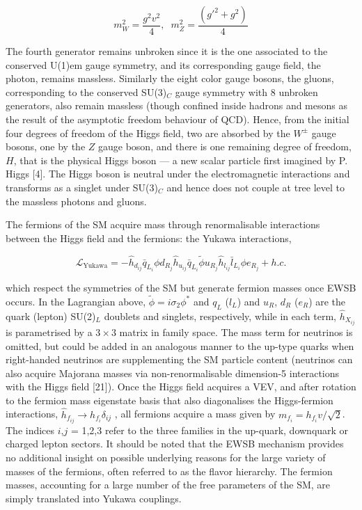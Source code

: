 \documentclass[12pt]{article}
\begin{document}
\begin{equation}
    m_W^2 = \frac{g^2v^2}{4}, \hspace{7pt} m_Z^2 = \frac{(g'^2+g^2)}{4}
\end{equation}

The fourth generator remains unbroken since it is the one associated to the conserved U(1)$\text{em}$ gauge symmetry, and its corresponding gauge field, the photon, remains massless. Similarly the eight color gauge bosons, the gluons, corresponding to the conserved SU(3)$_C$ gauge symmetry with 8 unbroken generators, also remain massless (though confined inside hadrons and mesons as the result of the asymptotic freedom behaviour of QCD). Hence, from the initial four degrees of freedom of the Higgs field, two are absorbed by the $W^\pm$ gauge bosons, one by the $Z$ gauge boson, and there is one remaining degree of freedom, $H$, that is the physical Higgs boson — a new scalar particle first imagined by P. Higgs [4]. The Higgs boson is neutral under the electromagnetic interactions and transforms as a singlet under SU(3)$_C$ and hence does not couple at tree level to the massless photons and gluons.

The fermions of the SM acquire mass through renormalisable interactions between the Higgs field and the fermions: the Yukawa interactions,

\begin{equation}
    \mathcal{L}_\text{Yukawa} = -\hat{h}_{d_{ij}} \bar{q}_{L_i}\phi d_{R_j} \hat{h}_{u_{ij}} \bar{q}_{L_i}\tilde{\phi} u_{R_j} \hat{h}_{l_{ij}} \bar{l}_{L_i}\phi e_{R_j} + h.c.
\end{equation}

which respect the symmetries of the SM but generate fermion
masses once EWSB occurs. In the Lagrangian above, $\tilde{\phi} = i\sigma_2\phi^*$ and $q_L$ ($l_L$) and $u_R$, $d_R$ ($e_R$) are the quark (lepton) SU(2)$_L$ doublets and singlets, respectively, while in each term, $\hat{h}_{X_{ij}}$ is parametrised by a $3\times3$ matrix in family space. The mass term for neutrinos is omitted, but could be added in an analogous manner to the up-type quarks when right-handed neutrinos are supplementing the SM particle content (neutrinos can also acquire Majorana masses via non-renormalisable dimension-5 interactions with the Higgs field [21]). Once the Higgs field acquires a VEV, and after rotation to the fermion mass eigenstate basis that also diagonalises the Higgs-fermion interactions, $\hat{h}_{f_{ij}} \rightarrow h_{f_i} \delta_{ij}$ , all fermions acquire a mass given by $m_{f_i} = h_{f_{i}} v/\sqrt{2}$. The indices $i$,$j$ = 1,2,3 refer to the three families in the up-quark, downquark or charged lepton sectors. It should be noted that the EWSB mechanism provides no additional insight on possible underlying reasons for the large variety of masses of the fermions, often referred to as the flavor hierarchy. The fermion masses, accounting for a large number of the free parameters of the SM, are simply translated into Yukawa couplings.
\end{document}
